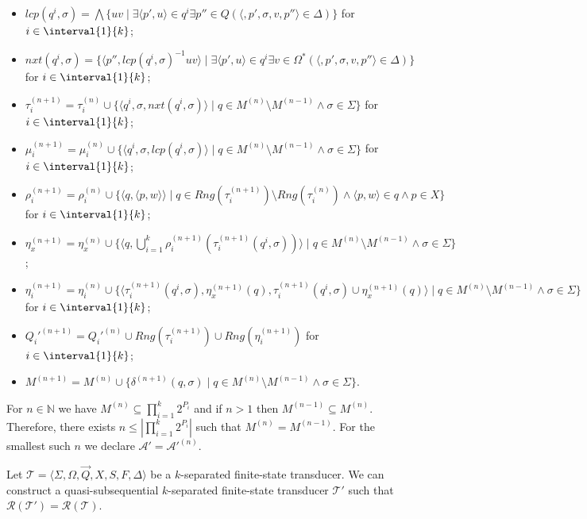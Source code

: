 \begin{construction}
	\begin{itemize}
		\item $lcp(q^i, \sigma) = \bigwedge \{ uv \mid \exists \langle
			p', u \rangle \in q^i \exists p'' \in Q (\langle, p',
			\sigma, v, p'' \rangle \in \Delta) \}$ for $i \in
			\interval{1}{k}$;
		\item $nxt(q^i, \sigma) = \{ \langle p'', lcp(q^i, \sigma)^{-1}uv
			\rangle \mid \exists \langle p', u \rangle \in q^i
			\exists v \in \Omega^* (\langle, p', \sigma, v, p'' \rangle
			\in \Delta) \}$ for $i \in \interval{1}{k}$;
		\item $\tau_i^{(n+1)} = \tau_i^{(n)} \cup \{ \langle q^i, \sigma,
			nxt(q^i, \sigma) \rangle \mid q \in M^{(n)} \setminus
			M^{(n-1)} \land \sigma \in \Sigma\}$ for $i \in
			\interval{1}{k}$;
		\item $\mu_i^{(n+1)} = \mu_i^{(n)} \cup \{ \langle q^i, \sigma,
			lcp(q^i, \sigma) \rangle \mid q \in M^{(n)} \setminus
			M^{(n-1)} \land \sigma \in \Sigma \}$ for $i \in
			\interval{1}{k}$;
		\item $\rho_i^{(n+1)} = \rho_i^{(n)} \cup \{ \langle q, \langle
			p, w \rangle \rangle \mid q \in Rng(\tau_i^{(n+1)})
			\setminus Rng(\tau_i^{(n)}) \land \langle p, w \rangle \in
			q \land p \in X \}$ for $i \in \interval{1}{k}$;
		\item $\eta_x^{(n+1)} = \eta_x^{(n)} \cup \{ \langle q,
			\bigcup_{i=1}^k \rho_i^{(n+1)}(\tau_i^{(n+1)}(q^i, \sigma))
			\rangle \mid q \in M^{(n)} \setminus M^{(n-1)} \land \sigma
			\in \Sigma \}$;
		\item $\eta_i^{(n+1)} = \eta_i^{(n)} \cup \{ \langle \tau_i^{(n+1)}
			(q^i, \sigma), \eta_x^{(n+1)}(q), \tau_i^{(n+1)}
			(q^i, \sigma) \cup \eta_x^{(n+1)}(q) \rangle
			\mid q \in M^{(n)} \setminus M^{(n-1)} \land \sigma \in
			\Sigma \}$ for $i \in \interval{1}{k}$;
		\item $Q_i'^{(n+1)} = Q_i'^{(n)} \cup Rng(\tau_i^{(n+1)}) \cup
			Rng(\eta_i^{(n+1)})$ for $i \in \interval{1}{k}$;
		\item $M^{(n+1)} = M^{(n)} \cup \{ \delta^{(n+1)}(q, \sigma) \mid q
			\in M^{(n)} \setminus M^{(n-1)} \land \sigma \in \Sigma \}$.
	\end{itemize}

	For $n \in \mathbb{N}$ we have $M^{(n)} \subseteq \prod_{i=1}^k{2^{P_i}}$
	and if $n > 1$ then $M^{(n-1)} \subseteq M^{(n)}$. Therefore, there
	exists $n \leq |\prod_{i=1}^k{2^{P_i}}|$ such that $M^{(n)} = M^{(n-1)}$.
	For the smallest such $n$ we declare $\mathcal{A}' = \mathcal{A}'^{(n)}$.
\end{construction}

\begin{theorem}
	Let $\mathcal{T} = \langle \Sigma, \Omega, \vec{Q}, X, S, F, \Delta \rangle$
	be a $k$-separated finite-state transducer. We can construct a
	quasi-subsequential $k$-separated finite-state transducer $\mathcal{T'}$
	such that $\mathcal{R}(\mathcal{T'}) = \mathcal{R}(\mathcal{T})$.
\end{theorem}
